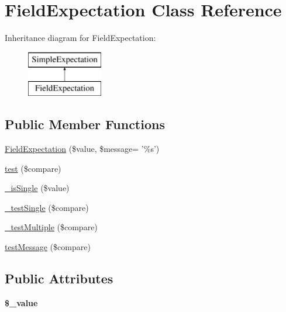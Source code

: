 \hypertarget{class_field_expectation}{
\section{FieldExpectation Class Reference}
\label{class_field_expectation}
}
Inheritance diagram for FieldExpectation:\begin{figure}[H]
\begin{center}
\leavevmode
\includegraphics[height=2.000000cm]{class_field_expectation}
\end{center}
\end{figure}
\subsection*{Public Member Functions}
\begin{DoxyCompactItemize}
\item 
\hyperlink{class_field_expectation_a4b7f7a62437287d18eb9eb6910694761}{FieldExpectation} (\$value, \$message= '\%s')
\item 
\hyperlink{class_field_expectation_a2c4a77d26920b75241f177d94e7b220e}{test} (\$compare)
\item 
\hyperlink{class_field_expectation_a634084e075491c4c6dffa60beb8c0659}{\_\-isSingle} (\$value)
\item 
\hyperlink{class_field_expectation_a4eef89d4a9de8a41a0981b3918523f5d}{\_\-testSingle} (\$compare)
\item 
\hyperlink{class_field_expectation_aefd7811a38a60fe675c445841cffdd8a}{\_\-testMultiple} (\$compare)
\item 
\hyperlink{class_field_expectation_a98958cce79aa0e8f98da5c8bb53c21fa}{testMessage} (\$compare)
\end{DoxyCompactItemize}
\subsection*{Public Attributes}
\begin{DoxyCompactItemize}
\item 
\hypertarget{class_field_expectation_a661384bc2b758f126df8ef87dcacd857}{
{\bfseries \$\_\-value}}
\label{class_field_expectation_a661384bc2b758f126df8ef87dcacd857}

\end{DoxyCompactItemize}


